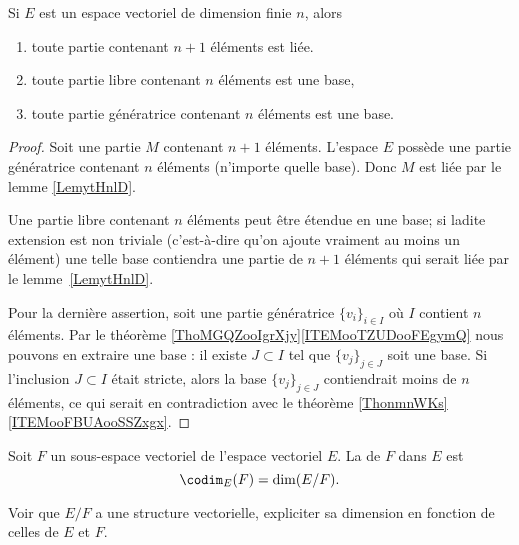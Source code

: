 \begin{proposition}     \label{PROPooVEVCooHkrldw}
	Si \( E\) est un espace vectoriel de dimension finie \( n\), alors
	\begin{enumerate}
		\item       \label{ITEMooZNLDooBISkJyBS}
		      toute partie contenant \( n+1\) éléments est liée.
		\item       \label{ITEMooSGGCooOUsuBs}
		      toute partie libre contenant \( n\) éléments est une base,
		\item
		      toute partie génératrice contenant \( n\) éléments est une base.
	\end{enumerate}
\end{proposition}

\begin{proof}
	Soit une partie \( M\) contenant \( n+1\) éléments. L'espace \( E\) possède une partie génératrice contenant \( n\) éléments (n'importe quelle base). Donc \( M\) est liée par le lemme \ref{LemytHnlD}.

	Une partie libre contenant \( n\) éléments peut être étendue en une base; si ladite extension est non triviale (c'est-à-dire qu'on ajoute vraiment au moins un élément) une telle base contiendra une partie de \( n+1\) éléments qui serait liée par le lemme~\ref{LemytHnlD}.

	Pour la dernière assertion, soit une partie génératrice \( \{ v_i \}_{i\in I}\) où \( I\) contient \( n\) éléments. Par le théorème \ref{ThoMGQZooIgrXjy}\ref{ITEMooTZUDooFEgymQ} nous pouvons en extraire une base : il existe \( J\subset I\) tel que \( \{ v_j \}_{j\in J}\) soit une base. Si l'inclusion \( J\subset I\) était stricte, alors la base \( \{ v_j \}_{j\in J}\) contiendrait moins de \( n\) éléments, ce qui serait en contradiction avec le théorème \ref{ThonmnWKs}\ref{ITEMooFBUAooSSZxgx}.
\end{proof}

\begin{definition}\label{DefCodimension}
	Soit \( F\) un sous-espace vectoriel de l'espace vectoriel \( E\). La  de \( F\) dans \( E\) est
	\begin{equation}
		\codim_E(F)=\dim(E/F).
	\end{equation}
\end{definition}

\begin{probleme}
	Voir que \( E/F\) a une structure vectorielle, expliciter sa dimension en fonction de celles de \( E\) et \( F\).
\end{probleme}


